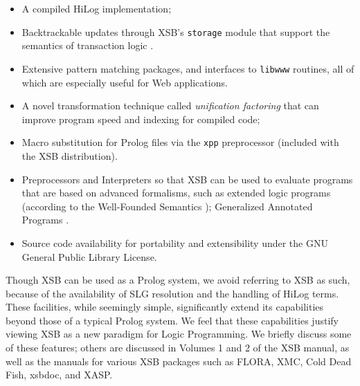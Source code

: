 \begin{itemize}
%
\item A compiled HiLog implementation;
%
\item Backtrackable updates through XSB's {\tt storage} module that
  support the semantics of transaction logic \cite{BoKi94}.
%
\item Extensive pattern matching packages, and interfaces to {\tt libwww}
  routines, all of which are especially useful for Web applications.
%
\item A novel transformation technique called {\em unification
factoring} that can improve program speed and indexing for compiled
code; 
%
\item Macro substitution for Prolog files via the {\tt xpp}
  preprocessor (included with the XSB distribution).
%
\item Preprocessors and Interpreters so that XSB can be used to evaluate
  programs that are based on advanced formalisms, such as extended logic
  programs (according to the Well-Founded Semantics \cite{ADP94});
  Generalized Annotated Programs \cite{KiSu92}.
%
\item Source code availability for portability and extensibility under
  the GNU General Public Library License.
\end{itemize}
 
Though XSB can be used as a Prolog system,
we avoid referring to XSB as such, because of the availability of SLG
resolution and the handling of HiLog terms.  These facilities, while
seemingly simple, significantly extend its capabilities beyond those
of a typical Prolog system. We feel that these capabilities justify
viewing XSB as a new paradigm for Logic Programming.  We briefly
discuss some of these features; others are discussed in Volumes 1 and
2 of the XSB manual, as well as the manuals for various XSB packages
such as FLORA, XMC, Cold Dead Fish, xsbdoc, and XASP.

